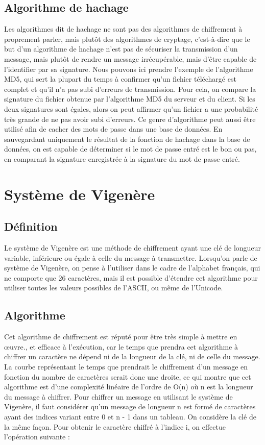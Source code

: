 		\subsection{Algorithme de hachage}
			Les algorithmes dit de hachage ne sont pas des algorithmes de chiffrement à proprement parler, mais plutôt des algorithmes de cryptage, c'est-à-dire que le but d'un algorithme de hachage n'est pas de sécuriser la transmission d'un message, mais plutôt de rendre un message irrécupérable, mais d'être capable de l'identifier par sa signature. Nous pouvons ici prendre l'exemple de l'algorithme MD5, qui sert la plupart du temps à confirmer qu'un fichier téléchargé est complet et qu'il n'a pas subi d'erreurs de transmission. Pour cela, on compare la signature du fichier obtenue par l'algorithme MD5 du serveur et du client. Si les deux signatures sont égales, alors on peut affirmer qu'un fichier a une probabilité très grande de ne pas avoir subi d'erreurs. Ce genre d'algorithme peut aussi être utilisé afin de cacher des mots de passe dans une base de données. En sauvegardant uniquement le résultat de la fonction de hachage dans la base de données, on est capable de déterminer si le mot de passe entré est le bon ou pas, en comparant la signature enregistrée à la signature du mot de passe entré.
	\section{Système de Vigenère}
		\subsection{Définition}
			Le système de Vigenère est une méthode de chiffrement ayant une clé de longueur variable, inférieure ou égale à celle du message à transmettre. Lorsqu'on parle de système de Vigenère, on pense à l'utiliser dans le cadre de l'alphabet français, qui ne comporte que 26 caractères, mais il est possible d'étendre cet algorithme pour utiliser toutes les valeurs possibles de l'ASCII, ou même de l'Unicode.
		\subsection{Algorithme}
			Cet algorithme de chiffrement est réputé pour être très simple à mettre en \oe{uvre.}, et efficace à l'exécution, car le temps que prendra cet algorithme à chiffrer un caractère ne dépend ni de la longueur de la clé, ni de celle du message. La courbe représentant le temps que prendrait le chiffrement d'un message en fonction du nombre de caractères serait donc une droite, ce qui montre que cet algorithme est d'une complexité linéaire de l'ordre de O(n) où n est la longueur du message à chiffrer.\linebreak
			Pour chiffrer un message en utilisant le système de Vigenère, il faut considérer qu'un message de longueur n est formé de caractères ayant des indices variant entre 0 et n - 1 dans un tableau. On considère la clé de la même façon. Pour obtenir le caractère chiffré à l'indice i, on effectue l'opération suivante :
			
